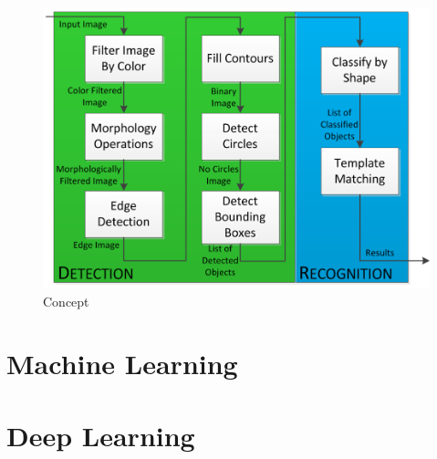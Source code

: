 \begin{figure}[H]
	\centering
	\includegraphics[width=\linewidth]{images/zynqconcept.png}
	\caption{Concept \cite{zynq}}\label{fig:zynq}
	\endminipage\hfill
\end{figure}

\section{Machine Learning}
\section{Deep Learning}